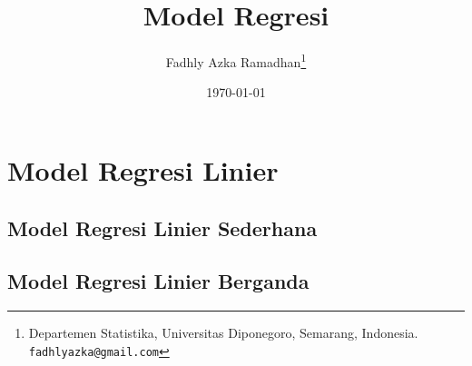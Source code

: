 \documentclass[10pt, letterpaper, openany]{book}
\title{Model Regresi}
\author{Fadhly Azka Ramadhan\thanks{Departemen Statistika, Universitas Diponegoro, Semarang, Indonesia. \texttt{fadhlyazka@gmail.com}}}
\date{\today}
\begin{document}
\frontmatter
\maketitle

\tableofcontents

\mainmatter
\chapter{Model Regresi Linier}
\label{sec:model-regresi-linier}
\section{Model Regresi Linier Sederhana}
\label{sec:mrln-sederhana}

\section{Model Regresi Linier Berganda}
\label{sec:mrln-berganda}



%

\backmatter
\end{document}
